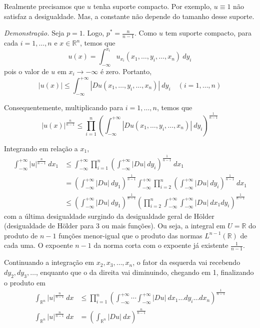 \documentclass[11pt]{article}
\newcommand{\R}{\mathbb{R}}
\newcommand{\Rn}{{\mathbb{R}^n}}
\begin{document}
Realmente precisamos que $u$ tenha suporte compacto. Por exemplo, $u \equiv 1$ não satisfaz a desigualdade. Mas, a constante não depende do tamanho desse suporte.

\textit{Demonstração.} Seja $p=1$. Logo, $p^* = \frac{n}{n-1}$. Como $u$ tem suporte compacto, para cada $i=1,\ldots,n$ e $x \in \Rn$, temos que \[ u(x) = \int_{-\infty}^{x_i} u_{x_i}(x_1, \ldots, y_i, \ldots, x_n) \ dy_i\] pois o valor de $u$ em $x_i \rightarrow -\infty$ é zero. Portanto, \[ |u(x)| \leq \int_{-\infty}^{+\infty} \left| Du(x_1, \ldots, y_i, \ldots, x_n) \right|\ dy_i \quad (i=1, \ldots, n)\]

Consequentemente, multiplicando para $i=1, \ldots, n$, temos que \[ |u(x)|^{\frac{n}{n-1}} \leq \prod_{i=1}^{n} \left( \int_{-\infty}^{+\infty} |Du(x_1, \ldots, y_i, \ldots, x_n)| \ dy_i \right)^{\frac{1}{n-1}}  \]

Integrando em relação a $x_1$, \begin{align*}
	\int_{-\infty}^{+\infty} |u|^{\frac{n}{n-1}}\ dx_1 &\leq \int_{-\infty}^{+\infty} \prod_{i=1}^{n} \left( \int_{-\infty}^{+\infty} |Du|\ dy_i \right)^{\frac{1}{n-1}}\ dx_1 \\
	&= \left( \int_{-\infty}^{+\infty} |Du|\ dy_1 \right)^{\frac{1}{n-1}} \int_{-\infty}^{+\infty} \prod_{i=2}^{n} \left( \int_{-\infty}^{+\infty} |Du|\ dy_i \right)^{\frac{1}{n-1}}\ dx_1 \\
	&\leq \left( \int_{-\infty}^{+\infty} |Du|\ dy_1 \right)^{\frac{1}{n-1}}  \left( \prod_{i=2}^{n} \int_{-\infty}^{+\infty} \int_{-\infty}^{+\infty} |Du|\ dx_1 dy_i \right)^{\frac{1}{n-1}} 
\end{align*} com a última desigualdade surgindo da desigualdade geral de Hölder (desigualdade de Hölder para 3 ou mais funções). Ou seja, a integral em $U=\R$ do produto de $n-1$ funções menor-igual que o produto das normas $L^{n-1}(\R)$  de cada uma. O expoente $n-1$ da norma corta com o expoente já existente \( \frac{1}{n-1} \).

Continuando a integração em $x_2, x_3, \ldots, x_n$, o fator da esquerda vai recebendo $dy_2, dy_3, \ldots$, enquanto que o da direita vai diminuindo, chegando em 1, finalizando o produto em \begin{align*}
	\int_\Rn |u|^{\frac{n}{n-1}}\ dx &\leq \prod_{i=1}^{n} \left(  \int_{-\infty}^{+\infty} \cdots \int_{-\infty}^{+\infty} |Du|\ dx_1 \ldots dy_i \ldots dx_n \right)^{\frac{1}{n-1}}\\
		\int_\Rn |u|^{\frac{n}{n-1}}\ dx &= \left( \int_{\Rn} |Du|\ dx \right)^{\frac{n}{n-1}}
\end{align*}  
\end{document}
